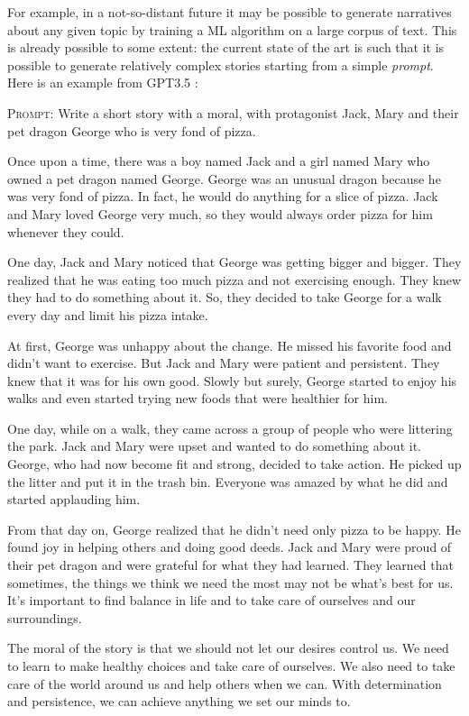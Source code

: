 For example, in a not-so-distant future it may be possible to generate narratives about any given topic by training a ML algorithm on a large corpus of text. This is already possible to some extent: the current state of the art is such that it is possible to generate relatively complex stories starting from a simple \emph{prompt}. Here is an example from GPT3.5 \citep{Brown2020}:

\begin{mycolorboxpar}
	\textsc{Prompt:} Write a short story with a moral, with protagonist Jack, Mary and their pet dragon George who is very fond of pizza.
	\tcblower
	
	Once upon a time, there was a boy named Jack and a girl named Mary who owned a pet dragon named George. George was an unusual dragon because he was very fond of pizza. In fact, he would do anything for a slice of pizza. Jack and Mary loved George very much, so they would always order pizza for him whenever they could.

	One day, Jack and Mary noticed that George was getting bigger and bigger. They realized that he was eating too much pizza and not exercising enough. They knew they had to do something about it. So, they decided to take George for a walk every day and limit his pizza intake.
	
	At first, George was unhappy about the change. He missed his favorite food and didn't want to exercise. But Jack and Mary were patient and persistent. They knew that it was for his own good. Slowly but surely, George started to enjoy his walks and even started trying new foods that were healthier for him.
	
	One day, while on a walk, they came across a group of people who were littering the park. Jack and Mary were upset and wanted to do something about it. George, who had now become fit and strong, decided to take action. He picked up the litter and put it in the trash bin. Everyone was amazed by what he did and started applauding him.

	From that day on, George realized that he didn't need only pizza to be happy. He found joy in helping others and doing good deeds. Jack and Mary were proud of their pet dragon and were grateful for what they had learned. They learned that sometimes, the things we think we need the most may not be what's best for us. It's important to find balance in life and to take care of ourselves and our surroundings.
	
	The moral of the story is that we should not let our desires control us. We need to learn to make healthy choices and take care of ourselves. We also need to take care of the world around us and help others when we can. With determination and persistence, we can achieve anything we set our minds to.
\end{mycolorboxpar}

